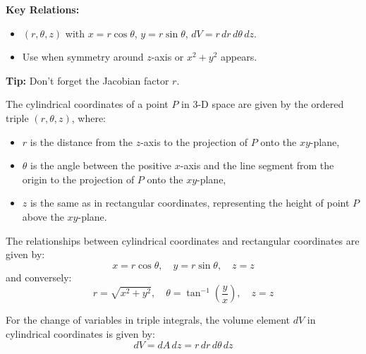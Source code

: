 \documentclass[11pt]{report}
\begin{document}
\begin{keybox}
	\textbf{Key Relations:}
\begin{itemize}
    \item $(r,\theta,z)$ with $x=r\cos\theta$, $y=r\sin\theta$, $dV=r\,dr\,d\theta\,dz$.
    \item Use when symmetry around $z$-axis or $x^2{+}y^2$ appears.
\end{itemize}
	\textbf{Tip:} Don’t forget the Jacobian factor $r$.
\end{keybox}
\begin{definition}
    The cylindrical coordinates of a point $P$ in 3-D space are given by the ordered triple $(r, \theta, z)$, where:
    \begin{itemize}
        \item $r$ is the distance from the $z$-axis to the projection of $P$ onto the $xy$-plane,
        \item $\theta$ is the angle between the positive $x$-axis and the line segment from the origin to the projection of $P$ onto the $xy$-plane,
        \item $z$ is the same as in rectangular coordinates, representing the height of point $P$ above the $xy$-plane.
    \end{itemize}
    The relationships between cylindrical coordinates and rectangular coordinates are given by:
    \begin{equation}
        x = r \cos \theta, \quad y = r \sin \theta, \quad z = z
    \end{equation}
    and conversely:
    \begin{equation}
        r = \sqrt{x^2 + y^2}, \quad \theta = \tan^{-1}\left(\frac{y}{x}\right), \quad z = z
    \end{equation}

    For the change of variables in triple integrals, the volume element $dV$ in cylindrical coordinates is given by:
    \begin{equation}
        dV = dA \, dz = r \, dr \, d\theta \, dz
    \end{equation}
\end{definition}
\end{document}
